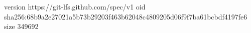 version https://git-lfs.github.com/spec/v1
oid sha256:68b9a2e27021a5b73b29203f463b62048c4809205d06f9f7ba61bcbdf4197fe6
size 349692
